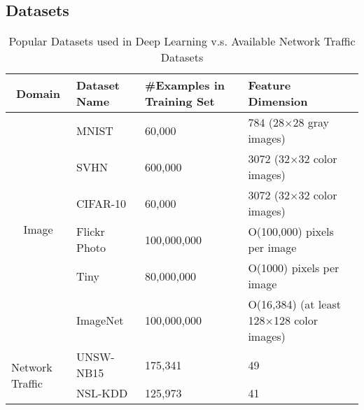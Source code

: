 \subsection{Datasets}

\begin{table*}[]
\centering
\caption{Popular Datasets used in Deep Learning v.s. Available Network Traffic Datasets}
\label{Tab:Datasets}
\begin{tabular}{c|l|l|l}
\multicolumn{1}{c|}{Domain}                           & Dataset Name  & \#Examples in Training Set & Feature Dimension                         \\
\hline
\hline
\multirow{6}{*}{Image}                               & MNIST         & 60,000                     & 784 (28$\times$28 gray images)                 \\
                                                     & SVHN          & 600,000                    & 3072 (32$\times$32 color images)                 \\
                                                     & CIFAR-10      & 60,000                     & 3072 (32$\times$32 color images)                 \\
                                                     & Flickr Photo  & 100,000,000                & O(100,000) pixels per image               \\
                                                     & Tiny          & 80,000,000                 & O(1000) pixels per image                  \\
                                                     & ImageNet      & 100,000,000                & O(16,384) (at least 128$\times$128 color images) \\
\hline
\multicolumn{1}{l|}{\multirow{2}{*}{Network Traffic}} & UNSW-NB15     & 175,341                    & 49                                        \\
\multicolumn{1}{l|}{}                                 & NSL-KDD       & 125,973                    & 41                                       
\end{tabular}
\end{table*}

